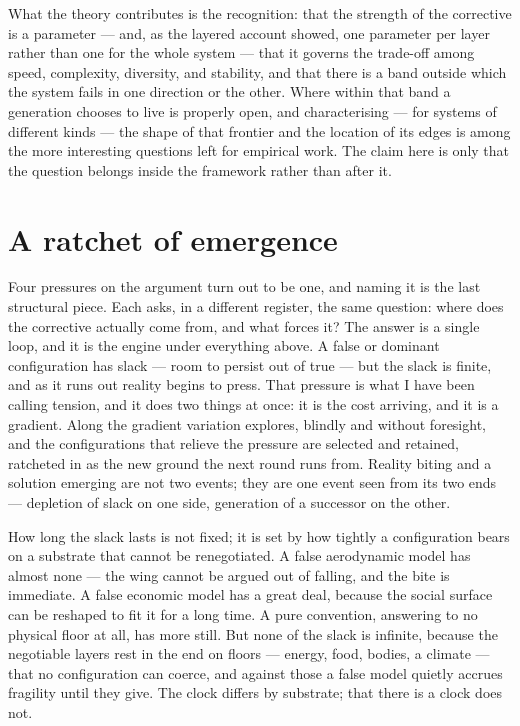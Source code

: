 \documentclass[11pt, a4paper]{report}
\begin{document}
What the theory contributes is the recognition: that the strength of the corrective is a parameter --- and, as the layered account showed, one parameter per layer rather than one for the whole system --- that it governs the trade-off among speed, complexity, diversity, and stability, and that there is a band outside which the system fails in one direction or the other. Where within that band a generation chooses to live is properly open, and characterising --- for systems of different kinds --- the shape of that frontier and the location of its edges is among the more interesting questions left for empirical work. The claim here is only that the question belongs inside the framework rather than after it.

\section{A ratchet of emergence}

Four pressures on the argument turn out to be one, and naming it is the last structural piece. Each asks, in a different register, the same question: where does the corrective actually come from, and what forces it? The answer is a single loop, and it is the engine under everything above. A false or dominant configuration has slack --- room to persist out of true --- but the slack is finite, and as it runs out reality begins to press. That pressure is what I have been calling tension, and it does two things at once: it is the cost arriving, and it is a gradient. Along the gradient variation explores, blindly and without foresight, and the configurations that relieve the pressure are selected and retained, ratcheted in as the new ground the next round runs from. Reality biting and a solution emerging are not two events; they are one event seen from its two ends --- depletion of slack on one side, generation of a successor on the other.

How long the slack lasts is not fixed; it is set by how tightly a configuration bears on a substrate that cannot be renegotiated. A false aerodynamic model has almost none --- the wing cannot be argued out of falling, and the bite is immediate. A false economic model has a great deal, because the social surface can be reshaped to fit it for a long time. A pure convention, answering to no physical floor at all, has more still. But none of the slack is infinite, because the negotiable layers rest in the end on floors --- energy, food, bodies, a climate --- that no configuration can coerce, and against those a false model quietly accrues fragility until they give. The clock differs by substrate; that there is a clock does not.
\end{document}
